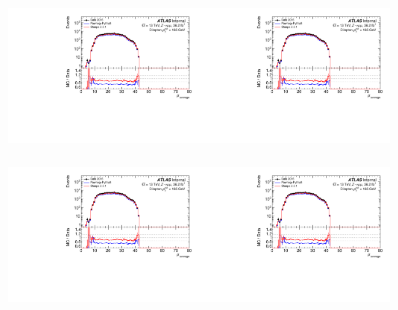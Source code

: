 \begin{figure}[h!]
  \centering
  \includegraphics[page=24,width=0.45\textwidth]{figures/ZjetOmnifoldMCDataComp.pdf}\includegraphics[page=32,width=0.45\textwidth]{figures/ZjetOmnifoldMCDataComp.pdf} \\
   \\
  \includegraphics[page=28,width=0.45\textwidth]{figures/ZjetOmnifoldMCDataComp.pdf}\includegraphics[page=36,width=0.45\textwidth]{figures/ZjetOmnifoldMCDataComp.pdf} \\

\end{figure}
